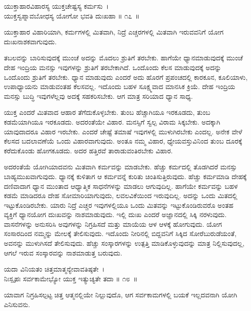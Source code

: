 \begin{shloka}
ಯುಕ್ತಾಹಾರವಿಹಾರಸ್ಯ ಯುಕ್ತಚೇಷ್ಟಸ್ಯ ಕರ್ಮಸು~।\\ಯುಕ್ತಸ್ವಪ್ನಾವಬೋಧಸ್ಯ ಯೋಗೋ ಭವತಿ ದುಃಖಹಾ \hfill॥ ೧೭~॥
\end{shloka}

\begin{artha}
ಯುಕ್ತಾಹಾರ ವಿಹಾರಿಯಾಗಿ, ಕರ್ಮಗಳಲ್ಲಿ ಮಿತವಾಗಿ, ನಿದ್ರೆ ಎಚ್ಚರಗಳಲ್ಲಿ ಮಿತವಾಗಿ ಇರುವವನಿಗೆ ಯೋಗ ದುಃಖನಾಶಕವಾಗುವುದು.
\end{artha}

ತಬಲವನ್ನು ಬಾರಿಸುವುದಕ್ಕೆ ಮುಂಚೆ ಅದನ್ನು ಮೊದಲು ಶ್ರುತಿಗೆ ತರಬೇಕು. ಹಾಗೆಯೇ ಧ್ಯಾನಮಾಡುವುದಕ್ಕೆ ಮುಂಚೆ ದೇಹ ಇಂದ್ರಿಯ ಮನಸ್ಸು ಇವುಗಳನ್ನು ಶ್ರುತಿಗೆ ತರಬೇಕಾಗಿದೆ. ಒಂದೊಂದು ಕೆಲಸ ಮಾಡುವುದಕ್ಕೆ ಅದನ್ನು ಒಂದೊಂದು ಶ್ರುತಿಗೆ ತರಬೇಕು. ಧ್ಯಾನ ಮಾಡುವುದು ಎಂದರೆ ಅದು ಹೊರಗೆ ಪ್ರಪಂಚದಲ್ಲಿ ಕಾರಕೂನ, ಕೂಲಿಯಾಳು, ಉಪಾಧ್ಯಾಯನು ಮಾಡುವಂತಹ ಕೆಲಸವಲ್ಲ. ಇದೊಂದು ಬಹಳ ಸೂಕ್ಷ್ಮವಾದ ಮಾನಸಿಕ ಕ್ರಿಯೆ. ದೇಹ ಇಂದ್ರಿಯ ಮನಸ್ಸು ಬುದ್ಧಿ ಇವುಗಳೆಲ್ಲವು ಅದಕ್ಕೆ ಸಹಕರಿಸಬೇಕು. ಆಗ ಮಾತ್ರ ಸರಿಯಾದ ಧ್ಯಾನ ಸಾಧ್ಯ.

ಯುಕ್ತ ಎಂದರೆ ಮಿತವಾದ ಆಹಾರ ತೆಗೆದುಕೊಳ್ಳಬೇಕು. ತುಂಬ ಹೆಚ್ಚಾಗಿಯೂ ಇರಕೂಡದು, ತುಂಬ ಕಡಮೆಯಾಗಿಯೂ ಇರಕೂಡದು. ಅದರಂತೆಯೇ ವಿಹಾರ. ಮನಸ್ಸಿಗೆ ಸ್ವಲ್ಪ ವಿರಾಮ ಸಿಕ್ಕಬೇಕು. ಅದಕ್ಕಾಗಿ ಯಾವುದಾದರೂ ವಿಹಾರ ಇರಬೇಕು. ಎಂದರೆ ಚೇಷ್ಟೆ ತಮಾಷೆ ಇವುಗಳಲ್ಲಿ ಮುಳುಗಿರಬೇಕು ಎಂದಲ್ಲ. ಅನೇಕ ವೇಳೆ ಕೆಲಸದ ಬದಲಾವಣೆಯೆ ಒಂದು ವಿಹಾರವಾಗುವುದು. ಅಂತೂ ನಮ್ಮ ವಿಹಾರ, ಧ್ಯೇಯವಸ್ತುವಿನಿಂದ ತುಂಬ ದೂರಕ್ಕೆ ಕರೆದುಕೊಂಡು ಹೋಗಕೂಡದು. ಅದರ ಹತ್ತಿರವೆ ತಾರಾಡುವಂತಿರಬೇಕು ವಿಹಾರ.

ಅದರಂತೆಯೆ ಯೋಗಿಯಾದವನು ಮಿತವಾಗಿ ಕರ್ಮವನ್ನು ಮಾಡಬೇಕು. ಹೆಚ್ಚು ಕರ್ಮದಲ್ಲಿ ತೊಡಗಿದರೆ ಮನಸ್ಸು ಬಾಹ್ಯಮುಖವಾಗುವುದು. ಧ್ಯಾನಕ್ಕೆ ಕುಳಿತಾಗ ಆ ಕರ್ಮವನ್ನೆ ಕುರಿತು ಚಿಂತಿಸುತ್ತಿರುವುದು. ಹೆಚ್ಚು ಕರ್ಮಮಾಡಿ ದೇಹಕ್ಕೆ ದಣಿವಾದಾಗ ಧ್ಯಾನ ಮುಂತಾದ ಆಧ್ಯಾತ್ಮಿಕ ಸಾಧನೆಗಳನ್ನು ಮಾಡಲು ಆಗುವುದಿಲ್ಲ. ಹಾಗೆಯೇ ಕರ್ಮವನ್ನು ಬಹಳ ಕಡಮೆ ಮಾಡಿದರೂ ದೇಹ ಸೋಮಾರಿಯಾಗುವುದು, ಲವಲವಿಕೆಯಿಂದ ಇರುವುದಿಲ್ಲ. ಅದನ್ನು ಒಂದು ಮಿತದಲ್ಲಿ ಇಟ್ಟುಕೊಂಡಿರಬೇಕು. ಯಾರು ನಿದ್ರೆ ಎಚ್ಚರ ಇವುಗಳಲ್ಲಿಯೂ ಒಂದು ಮಿತವನ್ನು ಇಟ್ಟುಕೊಂಡಿರುವರೊ ಅಂತಹ ವ್ಯಕ್ತಿಗೆ ಧ್ಯಾನಯೋಗ ದುಃಖವನ್ನು ನಾಶಮಾಡುವುದು. ಇಲ್ಲಿ ದುಃಖ ಎಂದರೆ ಅಜ್ಞಾನದಲ್ಲಿ ಸಿಕ್ಕಿ ನರಳುವುದು. ವಾಸನೆಗಳನ್ನು ಅನುಸರಿಸಿ ಅವುಗಳನ್ನು ನಿಗ್ರಹಿಸದೆ ಮತ್ತು ಮಾಯೆಯ ಆಳ ಆಳಕ್ಕೆ ಹೋಗುವುದು. ಯೋಗ ಸಂಸಾರದಿಂದ ನಮ್ಮನ್ನು ಮೇಲಕ್ಕೆ ತೇಲಿಸುವುದು. ಇದೊಂದು ನೀರಿನಲ್ಲಿ ಬಿದ್ದವನಿಗೆ ಸಿಕ್ಕಿದ ಸೋರೆಬುರುಡೆಯಂತೆ, ಅವನನ್ನು ಮುಳುಗಿಸದೆ ತೇಲಿಸುವುದು. ಹೆಚ್ಚು ಸಂಸ್ಕಾರಗಳನ್ನು ಉತ್ಪತ್ತಿ ಮಾಡಿಕೊಳ್ಳುವುದನ್ನು ಮಾತ್ರ ನಿಲ್ಲಿಸುವುದಲ್ಲ, ಆಗಲೆ ಇರುವ ಸಂಸ್ಕಾರವನ್ನು ನಾಶಮಾಡುತ್ತ ಬರುವುದು.

\begin{shloka}
ಯದಾ ವಿನಿಯತಂ ಚಿತ್ತಮಾತ್ಮನ್ಯೇವಾವತಿಷ್ಠತೇ~।\\ನಿಃಸ್ಪೃಹಃ ಸರ್ವಕಾಮೇಭ್ಯೋ ಯುಕ್ತ ಇತ್ಯುಚ್ಯತೇ ತದಾ \hfill॥ ೧೮~॥
\end{shloka}

\begin{artha}
ಯಾವಾಗ ನಿಗ್ರಹಿಸಲ್ಪಟ್ಟ ಚಿತ್ತ ಆತ್ಮನಲ್ಲಿಯೇ ನಿಲ್ಲುವುದೊ, ಆಗ ಸರ್ವಕಾಮಗಳಲ್ಲಿ ಬಯಕೆ ಇಲ್ಲದವನಾಗಿ ಯೋಗಿ ಎನಿಸುವನು.
\end{artha}

